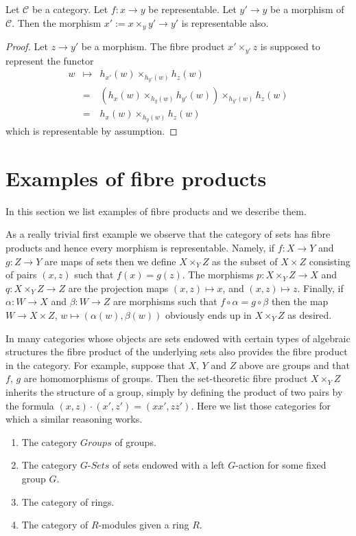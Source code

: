 \begin{lemma}
\label{lemma-base-change-representable}
Let $\mathcal{C}$ be a category.
Let $f : x \to y$ be representable.
Let $y' \to y$ be a morphism of
$\mathcal{C}$.
Then the morphism $x' := x \times_y y' \to
y'$ is representable also.
\end{lemma}

\begin{proof}
Let $z \to y'$ be a morphism. The fibre
product
$x' \times_{y'} z$ is supposed to represent
the
functor
\begin{eqnarray*}
w & \mapsto & h_{x'}(w)\times_{h_{y'}(w)}
h_z(w) \\
& = & (h_x(w) \times_{h_y(w)} h_{y'}(w))
\times_{h_{y'}(w)} h_z(w) \\
& = & h_x(w) \times_{h_y(w)} h_z(w)
\end{eqnarray*}
which is representable by assumption.
\end{proof}

\section{Examples of fibre products}
\label{section-example-fibre-products}

\noindent
In this section we list examples of fibre
products and
we describe them.

\medskip\noindent
As a really trivial first example we observe
that the category of sets has fibre products
and hence every
morphism is representable. Namely, if $f : X
\to Y$
and $g : Z \to Y$ are maps of sets then we
define
$X \times_Y Z$ as the subset of $X \times Z$
consisting
of pairs $(x, z)$ such that $f(x) = g(z)$.
The morphisms
$p : X \times_Y Z \to X$ and $q : X \times_Y
Z \to Z$ are
the projection maps $(x, z) \mapsto x$, and
$(x, z) \mapsto z$.
Finally, if $\alpha : W \to X$ and $\beta : W
\to Z$
are morphisms such that $f \circ \alpha = g
\circ \beta$
then the map $W \to X \times Z$, $w\mapsto
(\alpha(w), \beta(w))$
obviously ends up in $X \times_Y Z$ as
desired.

\medskip\noindent
In many categories whose objects are sets
endowed with certain types of
algebraic structures the fibre product of the
underlying sets also
provides the fibre product in the category.
For example, suppose
that $X$, $Y$ and $Z$ above are groups and
that $f$, $g$ are
homomorphisms of groups. Then the
set-theoretic fibre product
$X \times_Y Z$ inherits the structure of a
group, simply by
defining the product of two pairs by the
formula
$(x, z) \cdot (x', z') = (xx', zz')$. Here we
list those categories
for which a similar reasoning works.
\begin{enumerate}
\item The category $\textit{Groups}$ of
groups.
\item The category $G\textit{-Sets}$ of sets
endowed with a left $G$-action for some fixed
group $G$.
\item The category of rings.
\item The category of $R$-modules given a
ring $R$.
\end{enumerate}

